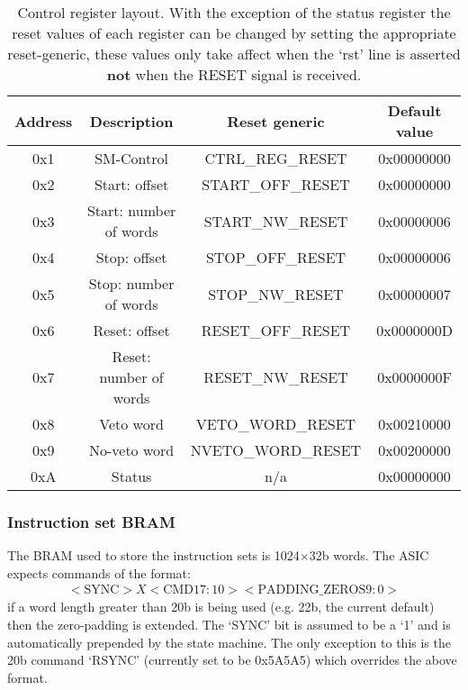 \documentclass[]{article}
\begin{document}
    \begin{table}
        \begin{center}
            \begin{tabular}{c|c | c |c}
                Address & Description             & Reset generic      & Default value  \\
                \hline                    
                0x1     & SM-Control              & CTRL\_REG\_RESET   & 0x00000000     \\ 
                0x2     & Start: offset           & START\_OFF\_RESET  & 0x00000000     \\  
                0x3     & Start: number of words  & START\_NW\_RESET   & 0x00000006     \\ 
                0x4     & Stop: offset            & STOP\_OFF\_RESET   & 0x00000006     \\ 
                0x5     & Stop: number of words   & STOP\_NW\_RESET    & 0x00000007     \\ 
                0x6     & Reset: offset           & RESET\_OFF\_RESET  & 0x0000000D     \\ 
                0x7     & Reset: number of words  & RESET\_NW\_RESET   & 0x0000000F     \\ 
                0x8     & Veto word               & VETO\_WORD\_RESET  & 0x00210000     \\ 
                0x9     & No-veto word            & NVETO\_WORD\_RESET & 0x00200000     \\ 
                0xA     & Status                  & n/a                & 0x00000000     \\ 
            \end{tabular}
        \end{center}
        \caption{Control register layout. With the exception of the status register the reset values of each register can be changed by setting the appropriate reset-generic, these values only take affect when the `rst' line is asserted \textbf{not} when the RESET signal is received.}
        \label{tab:ctrl_reg_default}
    \end{table}

    \subsubsection{Instruction set BRAM} %
    \label{sub:tx_bram}
    The BRAM used to store the instruction sets is 1024\(\times\)32b words. The ASIC expects commands of the format:
    \begin{align}\label{fmt:asic_format}
        <\text{SYNC}>X<\text{CMD} 17:10><\text{PADDING\_ZEROS} 9:0>
    \end{align}
    if a word length greater than 20b is being used (e.g. 22b, the current default) then the zero-padding is extended. The `SYNC' bit is assumed to be a `1' and is automatically prepended by the state machine. The only exception to this is the 20b command `RSYNC' (currently set to be 0x5A5A5) which overrides the above format.
\end{document}
